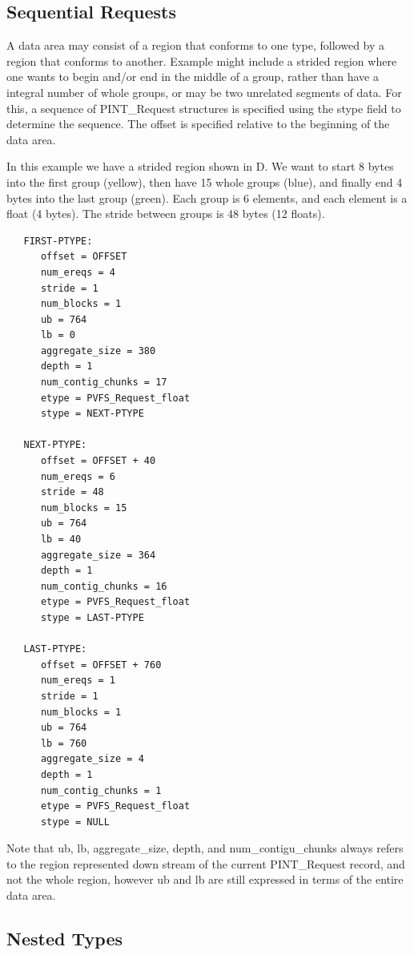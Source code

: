 \documentclass[12pt]{article} %
\begin{document}
\subsection*{Sequential Requests}

A data area may consist of a region that conforms to one type,
followed by a region that conforms to another.  Example might
include a strided region where one wants to begin and/or end
in the middle of a group, rather than have a integral number
of whole groups, or may be two unrelated segments of data.
For this, a sequence of PINT\_Request structures is specified
using the stype field to determine the sequence.  The offset
is specified relative to the beginning of the data area.

In this example we have a strided region shown in D.  We want to start
8 bytes into the first group (yellow), then have 15 whole groups (blue), and
finally end 4 bytes into the last group (green).  Each group is 6
elements, and each element is a float (4 bytes).  The stride
between groups is 48 bytes (12 floats).

\begin{verbatim}
   FIRST-PTYPE:
      offset = OFFSET
      num_ereqs = 4
      stride = 1
      num_blocks = 1
      ub = 764
      lb = 0
      aggregate_size = 380
      depth = 1
      num_contig_chunks = 17
      etype = PVFS_Request_float
      stype = NEXT-PTYPE
   
   NEXT-PTYPE:
      offset = OFFSET + 40
      num_ereqs = 6
      stride = 48
      num_blocks = 15
      ub = 764
      lb = 40
      aggregate_size = 364
      depth = 1
      num_contig_chunks = 16
      etype = PVFS_Request_float
      stype = LAST-PTYPE
   
   LAST-PTYPE:
      offset = OFFSET + 760
      num_ereqs = 1
      stride = 1
      num_blocks = 1
      ub = 764
      lb = 760
      aggregate_size = 4
      depth = 1
      num_contig_chunks = 1
      etype = PVFS_Request_float
      stype = NULL
\end{verbatim}

Note that ub, lb, aggregate\_size, depth, and num\_contigu\_chunks always
refers to the region
represented down stream of the current PINT\_Request record, and not the
whole region, however ub and lb are still expressed in terms of the
entire data area.

\subsection*{Nested Types}
\end{document}

